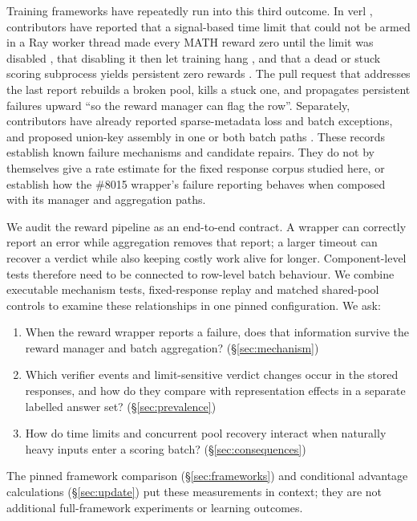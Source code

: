 \documentclass[10pt,a4paper]{article}
\let\cite\citep
\begin{document}
Training frameworks have repeatedly run into this third outcome. In verl \cite{sheng2024hybridflow}, contributors have reported that a
signal-based time limit that could not be armed in a Ray worker thread made
every MATH reward zero until the limit was disabled \cite{verl5635}, that
disabling it then let training hang \cite{verl5839}, and that a dead or stuck
scoring subprocess yields persistent zero rewards \cite{verl8011}. The pull request that addresses the last report
\cite{verl8015} rebuilds a broken pool, kills a stuck one, and propagates
persistent failures upward ``so the reward manager can flag the row''.
Separately, contributors have already reported sparse-metadata loss and
batch exceptions, and proposed union-key assembly in one or both batch
paths \cite{verl6545,verl7151}. These records establish known failure
mechanisms and candidate repairs. They do not by themselves give a rate
estimate for the fixed response corpus studied here, or establish how
the \#8015 wrapper's failure reporting behaves when composed with its
manager and aggregation paths.

We audit the reward pipeline as an end-to-end contract. A wrapper can
correctly report an error while aggregation removes that report; a larger
timeout can recover a verdict while also keeping costly work alive for
longer. Component-level tests therefore need to be connected to row-level
batch behaviour. We combine executable mechanism tests, fixed-response
replay and matched shared-pool controls to examine these relationships in
one pinned configuration. We ask:
\begin{enumerate}[label=\textbf{RQ\arabic*},leftmargin=*]
\item When the reward wrapper reports a failure, does that information
      survive the reward manager and batch aggregation?
      (\S\ref{sec:mechanism})
\item Which verifier events and limit-sensitive verdict changes occur in
      the stored responses, and how do they compare with representation
      effects in a separate labelled answer set?
      (\S\ref{sec:prevalence})
\item How do time limits and concurrent pool recovery interact when
      naturally heavy inputs enter a scoring batch?
      (\S\ref{sec:consequences})
\end{enumerate}
The pinned framework comparison (\S\ref{sec:frameworks}) and conditional
advantage calculations (\S\ref{sec:update}) put these measurements in
context; they are not additional full-framework experiments or learning
outcomes.
\end{document}
